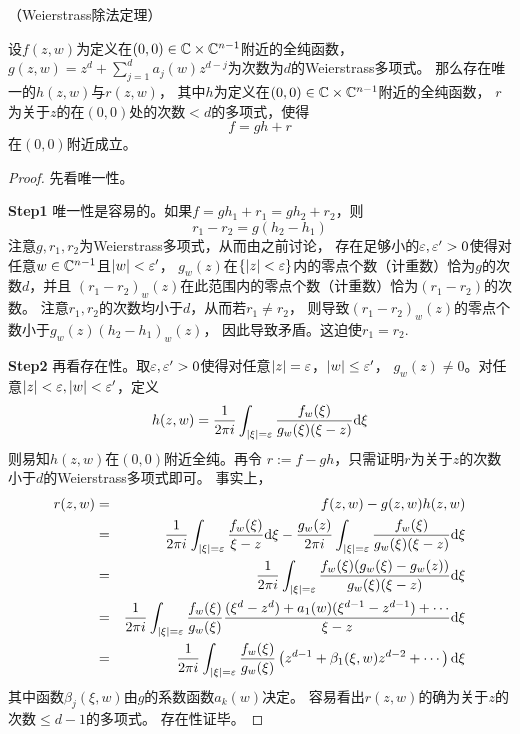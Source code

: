 \begin{thm}（Weierstrass除法定理）

设$f(z,w)$为定义在$(0,0)\in\mathbb{C}\times\mathbb{C}^{n-1}$附近的全纯函数，
$g(z,w)=z^d+\sum\limits_{j=1}^da_j(w)z^{d-j}$为次数为$d$的Weierstrass多项式。
那么存在唯一的$h(z,w)$与$r(z,w)$，
其中$h$为定义在$(0,0)\in\mathbb{C}\times\mathbb{C}^{n-1}$附近的全纯函数，
$r$为关于$z$的在$(0,0)$处的次数$<d$的多项式，使得
$$f=gh+r$$
在$(0,0)$附近成立。
\end{thm}

\begin{proof}先看唯一性。

\textbf{Step1}
唯一性是容易的。如果$f=gh_1+r_1=gh_2+r_2$，则
$$r_1-r_2=g(h_2-h_1)$$
注意$g,r_1,r_2$为Weierstrass多项式，从而由之前讨论，
存在足够小的$\varepsilon,\varepsilon'>0$使得对任意$w\in\mathbb{C}^{n-1}$且$|w|<\varepsilon'$，
$g_w(z)$在$\{|z|<\varepsilon\}$内的零点个数（计重数）恰为$g$的次数$d$，并且
$(r_1-r_2)_w(z)$在此范围内的零点个数（计重数）恰为$(r_1-r_2)$的次数。
注意$r_1,r_2$的次数均小于$d$，从而若$r_1\neq r_2$，
则导致$(r_1-r_2)_w(z)$的零点个数小于$g_w(z)(h_2-h_1)_w(z)$，
因此导致矛盾。这迫使$r_1=r_2$.

\textbf{Step2}
再看存在性。取$\varepsilon,\varepsilon'>0$使得对任意$|z|=\varepsilon$，$|w|\leq\varepsilon'$，
$g_w(z)\neq 0$。对任意$|z|<\varepsilon,|w|<\varepsilon'$，定义
\begin{eqnarray*}
     h(z,w)
 =
     \frac{1}{2\pi i}
     \int_{|\xi|=\varepsilon}
       \frac{f_w(\xi)}
            {g_w(\xi)(\xi-z)}
       \mathrm{d}\xi
\end{eqnarray*}
则易知$h(z,w)$在$(0,0)$附近全纯。再令
$r:=f-gh$，只需证明$r$为关于$z$的次数小于$d$的Weierstrass多项式即可。
事实上，
\begin{eqnarray*}
     r(z,w)
&=&
     f(z,w)-g(z,w)h(z,w)\\
&=&
     \frac{1}{2\pi i}
     \int_{|\xi|=\varepsilon}
       \frac{f_w(\xi)}{\xi-z}
       \mathrm{d}\xi
    -\frac{g_w(z)}{2\pi i}
     \int_{|\xi|=\varepsilon}
       \frac{f_w(\xi)}
            {g_w(\xi)(\xi-z)}
       \mathrm{d}\xi\\
&=&
     \frac{1}{2\pi i}
     \int_{|\xi|=\varepsilon}
       \frac{f_w(\xi)(g_w(\xi)-g_w(z))}
            {g_w(\xi)(\xi-z)}
       \mathrm{d}\xi\\
&=&
     \frac{1}{2\pi i}
     \int_{|\xi|=\varepsilon}
       \frac{f_w(\xi)}{g_w(\xi)}
       \frac{(\xi^d-z^d)+a_1(w)(\xi^{d-1}-z^{d-1})+\cdots}
            {\xi-z}
       \mathrm{d}\xi\\
&=&
     \frac{1}{2\pi i}
     \int_{|\xi|=\varepsilon}
       \frac{f_w(\xi)}{g_w(\xi)}
       \left(
         z^{d-1}+\beta_1(\xi,w)z^{d-2}+\cdots
       \right)
       \mathrm{d}\xi
\end{eqnarray*}
其中函数$\beta_j(\xi,w)$由$g$的系数函数$a_k(w)$决定。
容易看出$r(z,w)$的确为关于$z$的次数$\leq d-1$的多项式。
存在性证毕。
\end{proof}


